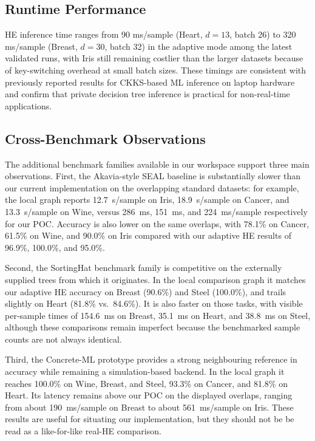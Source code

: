 \documentclass[runningheads]{llncs}
\begin{document}
\subsection{Runtime Performance}

HE inference time ranges from 90 ms/sample (Heart, $d = 13$, batch 26) to
320 ms/sample (Breast, $d = 30$, batch 32) in the adaptive mode among the
latest validated runs, with Iris still remaining costlier than the larger
datasets because of key-switching overhead at small batch sizes.  These
timings are consistent with previously reported
results for CKKS-based ML inference on laptop hardware~\cite{dathathri2019chet}
and confirm that private decision tree inference is practical for
non-real-time applications.

\subsection{Cross-Benchmark Observations}

The additional benchmark families available in our workspace support three
main observations.  First, the Akavia-style SEAL baseline is substantially
slower than our current implementation on the overlapping standard datasets:
for example, the local graph reports 12.7~s/sample on Iris, 18.9~s/sample on
Cancer, and 13.3~s/sample on Wine, versus 286~ms, 151~ms, and 224~ms/sample
respectively for our POC.  Accuracy is also lower on the same overlaps, with
78.1\% on Cancer, 61.5\% on Wine, and 90.0\% on Iris compared with our
adaptive HE results of 96.9\%, 100.0\%, and 95.0\%.

Second, the SortingHat benchmark family is competitive on the externally
supplied trees from which it originates.  In the local comparison graph it
matches our adaptive HE accuracy on Breast (90.6\%) and Steel (100.0\%), and
trails slightly on Heart (81.8\% vs.\ 84.6\%).  It is also faster on those
tasks, with visible per-sample times of 154.6~ms on Breast, 35.1~ms on
Heart, and 38.8~ms on Steel, although these comparisons remain imperfect
because the benchmarked sample counts are not always identical.

Third, the Concrete-ML prototype provides a strong neighbouring reference in
accuracy while remaining a simulation-based backend.  In the local graph it
reaches 100.0\% on Wine, Breast, and Steel, 93.3\% on Cancer, and 81.8\% on
Heart.  Its latency remains above our POC on the displayed overlaps, ranging
from about 190~ms/sample on Breast to about 561~ms/sample on Iris.  These
results are useful for situating our implementation, but they should not be
be read as a like-for-like real-HE comparison.
\end{document}
